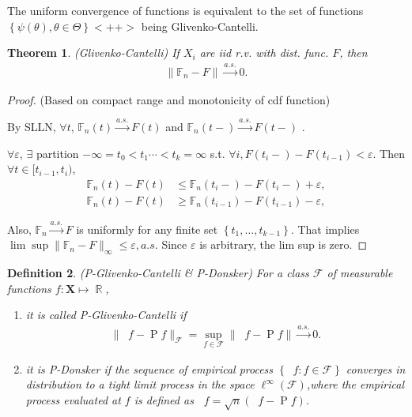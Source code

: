 \documentclass[12pt,a4paper]{article}
\newcommand{\R}{\mathop{\mathbb{R}}}
\newcommand{\pr}{\mathop{\mathrm{P}}}
\newcommand{\pn}{\mathop{\mathbb{P}_n}}
\newcommand{\gn}{\mathop{\mathbb{G}_n}}
\def \asconv {\stackrel{a.s.}{\longrightarrow}}
\def \XX{\mathbf{X}}
\def \mscrF {\mathscr{F}}
\newtheorem{theorem}{Theorem}[section]
\newtheorem{definition}[theorem]{Definition}
\begin{document}
The uniform convergence of functions is equivalent to the set of functions 
$\left\{ \psi(\theta),\theta \in \Theta\right\}<++>$ being Glivenko-Cantelli.

\begin{theorem}\citep[page 266, thm 19.1]{vaart}
  (Glivenko-Cantelli) If $X_i$ are iid r.v. with dist. func. $F$, then
  \begin{align*}
	\|\mathbb{F}_n - F\|\asconv 0.
  \end{align*}
  \label{g-c}
\end{theorem}
\begin{proof}
  (Based on compact range and monotonicity of cdf function)

  By SLLN, $\forall t$, $\mathbb{F}_n(t)\asconv F(t)$ and $\mathbb{F}_n(t-)\asconv F(t-)$ .

  $\forall \varepsilon$, $\exists$ partition $-\infty=t_0<t_1\cdots <t_k=\infty$ s.t.  $\forall i, F(t_i-)-F(t_{i-1})<\varepsilon$.
  Then $\forall t\in[t_{i-1},t_i)$,
  \begin{align*}
	\mathbb{F}_n(t) - F(t) &\le \mathbb{F}_n(t_i-)-F(t_i-) + \varepsilon,\\
	\mathbb{F}_n(t) - F(t) &\ge \mathbb{F}_n(t_{i-1})-F(t_{i-1}) - \varepsilon,
  \end{align*}

  Also, $\mathbb{F}_n\asconv F$ is uniformly for any finite set $\left\{ t_1,\dots,t_{k-1} \right\}$.
  That implies $\lim\sup \|\mathbb{F}_n-F\|_{\infty}\le \varepsilon,a.s.$  Since $\varepsilon$ is arbitrary, the lim sup is zero.
\end{proof}

\begin{definition}
	(P-Glivenko-Cantelli \& P-Donsker)
  For a class $\mscrF$ of measurable functions $f:\XX\mapsto \R$, 
	\begin{enumerate}
		\item it is called P-Glivenko-Cantelli if
  \begin{align*}
	\|\pn f - \pr f\|_\mscrF = \sup_{f\in\mscrF} \| \pn f - \pr f\| \asconv 0.
  \end{align*}

  \item it is P-Donsker if the sequence of empirical process $\left\{ \gn f : f\in \mscrF \right\}$
		converges in distribution to a tight limit process in the space $\ell^\infty(\mscrF)$,where the empirical process evaluated at $f$ is defined as $\gn f = \sqrt{n}(\pn f - \pr f)$.
	\end{enumerate}
\end{definition}
\end{document}
